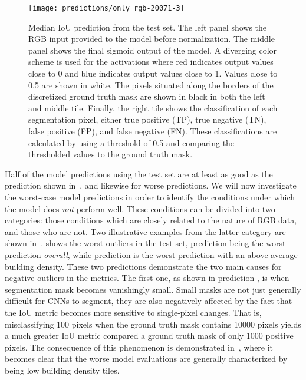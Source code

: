 \begin{figure}[H]
  \centering
  \texttt{[image: predictions/only\_rgb-20071-3]}  %
  \caption{%
    Median IoU prediction from the test set.
    The left panel shows the RGB input provided to the model before normalization.
    The middle panel shows the final sigmoid output of the model.
    A diverging color scheme is used for the activations where red indicates output values close to \num{0} and blue indicates output values close to \num{1}.
    Values close to \num{0.5} are shown in white.
    The pixels situated along the borders of the discretized ground truth mask are shown in black in both the left and middle tile.
    Finally, the right tile shows the classification of each segmentation pixel, either true positive (TP), true negative (TN), false positive (FP), and false negative (FN).
    These classifications are calculated by using a threshold of \num{0.5} and comparing the thresholded values to the ground truth mask.
  }%
  \label{fig:rgb-median-prediction}\label{fig:rgb-explanation}
\end{figure}

Half of the model predictions using the test set are at least as good as the prediction shown in~, and likewise for worse predictions.
We will now investigate the worst-case model predictions in order to identify the conditions under which the model does \emph{not} perform well.
These conditions can be divided into two categories: those conditions which are closely related to the nature of RGB data, and those who are not.
Two illustrative examples from the latter category are shown in~.
 shows the worst outliers in the test set, prediction  being the worst prediction \emph{overall}, while prediction  is the worst prediction with an above-average building density. %
These two predictions demonstrate the two main causes for negative outliers in the metrics.
The first one, as shown in prediction , is when segmentation mask becomes vanishingly small.
Small masks are not just generally difficult for CNNs to segment, they are also negatively affected by the fact that the IoU metric becomes more sensitive to single-pixel changes.
That is, misclassifying 100 pixels when the ground truth mask contains \num{10000} pixels yields a much greater IoU metric compared a ground truth mask of only \num{1000} positive pixels.
The consequence of this phenomenon is demonstrated in~, where it becomes clear that the worse model evaluations are generally characterized by being low building density tiles.

